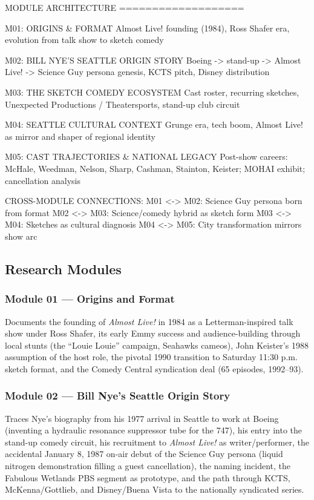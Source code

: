 \documentclass[11pt,letterpaper]{article}
\begin{document}
\begin{asciibox}
MODULE ARCHITECTURE
===================

  M01: ORIGINS & FORMAT
    Almost Live! founding (1984), Ross Shafer era,
    evolution from talk show to sketch comedy

  M02: BILL NYE'S SEATTLE ORIGIN STORY
    Boeing -> stand-up -> Almost Live! -> Science Guy
    persona genesis, KCTS pitch, Disney distribution

  M03: THE SKETCH COMEDY ECOSYSTEM
    Cast roster, recurring sketches, Unexpected
    Productions / Theatersports, stand-up club circuit

  M04: SEATTLE CULTURAL CONTEXT
    Grunge era, tech boom, Almost Live! as mirror
    and shaper of regional identity

  M05: CAST TRAJECTORIES & NATIONAL LEGACY
    Post-show careers: McHale, Weedman, Nelson,
    Sharp, Cashman, Stainton, Keister; MOHAI exhibit;
    cancellation analysis

  CROSS-MODULE CONNECTIONS:
  M01 <-> M02: Science Guy persona born from format
  M02 <-> M03: Science/comedy hybrid as sketch form
  M03 <-> M04: Sketches as cultural diagnosis
  M04 <-> M05: City transformation mirrors show arc
\end{asciibox}

\subsection{Research Modules}

\subsubsection{Module 01 --- Origins and Format}
Documents the founding of \textit{Almost Live!} in 1984 as a Letterman-inspired talk show under Ross Shafer, its early Emmy success and audience-building through local stunts (the ``Louie Louie'' campaign, Seahawks cameos), John Keister's 1988 assumption of the host role, the pivotal 1990 transition to Saturday 11:30 p.m. sketch format, and the Comedy Central syndication deal (65 episodes, 1992--93).

\subsubsection{Module 02 --- Bill Nye's Seattle Origin Story}
Traces Nye's biography from his 1977 arrival in Seattle to work at Boeing (inventing a hydraulic resonance suppressor tube for the 747), his entry into the stand-up comedy circuit, his recruitment to \textit{Almost Live!} as writer/performer, the accidental January 8, 1987 on-air debut of the Science Guy persona (liquid nitrogen demonstration filling a guest cancellation), the naming incident, the Fabulous Wetlands PBS segment as prototype, and the path through KCTS, McKenna/Gottlieb, and Disney/Buena Vista to the nationally syndicated series.
\end{document}
